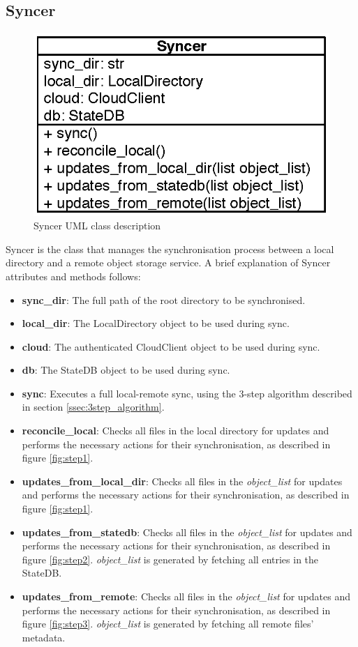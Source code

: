  \subsection{Syncer}
    \begin{figure}[!htpb]
      \centering
      \includegraphics{Images/Syncer.eps}
      \caption{Syncer UML class description}
      \label{fig:syncer_uml}
    \end{figure}
    Syncer is the class that manages the synchronisation process between a local directory and a remote object storage service. A brief explanation of Syncer attributes and methods follows:
    \begin{itemize}
      \item \textbf{sync\_dir}: The full path of the root directory to be synchronised.
      \item \textbf{local\_dir}: The LocalDirectory object to be used during sync.
      \item \textbf{cloud}: The authenticated CloudClient object to be used during sync.
      \item \textbf{db}: The StateDB object to be used during sync.\\

      \item \textbf{sync}: Executes a full local-remote sync, using the 3-step algorithm described in section \ref{ssec:3step_algorithm}.
      \item \textbf{reconcile\_local}: Checks all files in the local directory for updates and performs the necessary actions for their synchronisation, as described in figure \ref{fig:step1}.
      \item \textbf{updates\_from\_local\_dir}: Checks all files in the \emph{object\_list} for updates and performs the necessary actions for their synchronisation, as described in figure \ref{fig:step1}.
      \item \textbf{updates\_from\_statedb}: Checks all files in the \emph{object\_list} for updates and performs the necessary actions for their synchronisation, as described in figure \ref{fig:step2}. \emph{object\_list} is generated by fetching all entries in the StateDB.
      \item \textbf{updates\_from\_remote}: Checks all files in the \emph{object\_list} for updates and performs the necessary actions for their synchronisation, as described in figure \ref{fig:step3}. \emph{object\_list} is generated by fetching all remote files' metadata.
    \end{itemize}